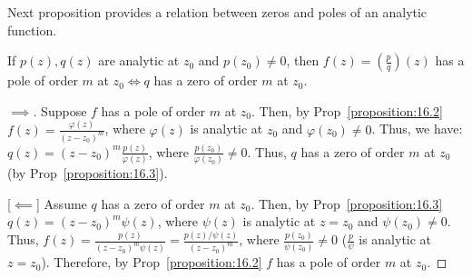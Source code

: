 Next proposition provides a relation between zeros and poles of an analytic function.

\begin{proposition}\label{proposition:16.4}
    If $p(z), q(z)$ are analytic at $z_0$ and $p(z_0) \neq 0$, then $f(z) = (\frac{p}{q})(z)$ has a pole of order $m$ at $z_0 \iff q$ has a zero of order $m$ at $z_0$.
\end{proposition}
\begin{proof}
    [$\implies$] Suppose $f$ has a pole of order $m$ at $z_0$. Then, by Prop~\ref{proposition:16.2} $f(z) = \frac{\varphi(z)}{(z-z_0)^m}$, where $\varphi(z)$ is analytic at $z_0$ and $\varphi(z_0) \neq 0$. 
    Thus, we have: $q(z) = (z-z_0)^m \frac{p(z)}{\varphi(z)}$, where $\frac{p(z_0)}{\varphi(z_0)} \neq 0$. 
    Thus, $q$ has a zero of order $m$ at $z_0$ (by Prop~\ref{proposition:16.3}).
    
    [$\impliedby$] Assume $q$ has a zero of order $m$ at $z_0$. Then, by Prop~\ref{proposition:16.3} $q(z) = (z-z_0)^m \psi(z)$, where $\psi(z)$ is analytic at $z = z_0$ and $\psi(z_0) \neq 0$. 
    Thus, $f(z) = \frac{p(z)}{(z-z_0)^m \psi(z)} = \frac{p(z)/\psi(z)}{(z-z_0)^m}$, where $\frac{p(z_0)}{\psi(z_0)} \neq 0$ ($\frac{p}{\psi}$ is analytic at $z = z_0$). 
    Therefore, by Prop~\ref{proposition:16.2} $f$ has a pole of order $m$ at $z_0$.
\end{proof}

